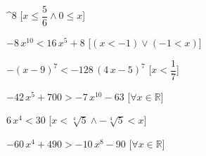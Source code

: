 \begin{esercizio}
\begin{enumeratea}
^{8}\) 
\hfill [\(x\leq {\dfrac{5}{6}} \wedge 0\leq x\)]
\item \(-8\,{x}^{10}<16\,{x}^{5}+8\) 
\hfill [\((x<-1)\vee (-1<x)\)]
\item \(- \left( x-9 \right) ^{7}<-128\, \left( 4\,x-5 \right) ^{7}\) 
\hfill [\(x<{\dfrac{1}{7}}\)]
\item \(-42\,{x}^{5}+700>-7\,{x}^{10}-63\) 
\hfill [\(\forall x \in \mathbb{R}\)]
\item \(6\,{x}^{4}<30\) 
\hfill [\(x<\sqrt [4]{5} \wedge -\sqrt [4]{5}<x\)]
\item \(-60\,{x}^{4}+490>-10\,{x}^{8}-90\) 
\hfill [\(\forall x \in \mathbb{R}\)]
\end{enumeratea}
\end{esercizio}

